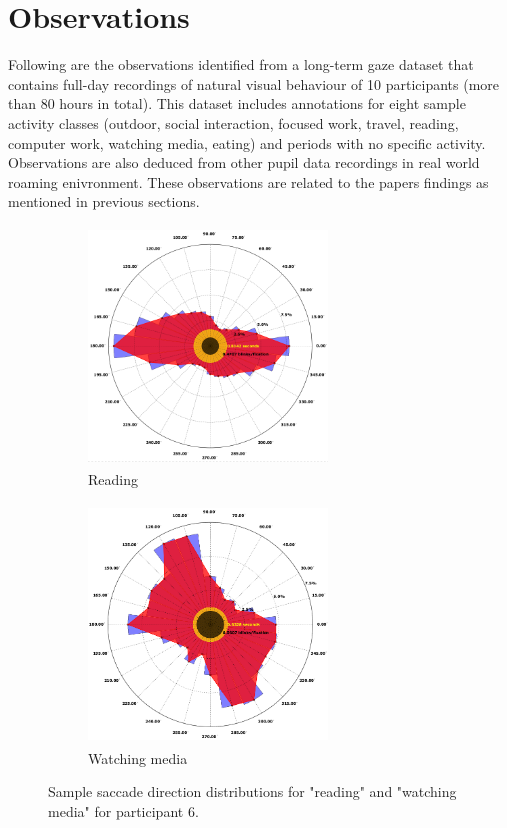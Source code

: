 \newpage

\section{Observations}

Following are the observations identified from a long-term gaze dataset \cite{28} that contains full-day recordings of natural visual behaviour of 10 participants (more than 80 hours in total). This dataset includes annotations for eight sample activity classes (outdoor, social interaction, focused work, travel, reading, computer work, watching media, eating) and periods with no specific activity. Observations are also deduced from other pupil data recordings in real world roaming enivronment. These observations are related to the papers findings as mentioned in previous sections.\\

\begin{figure}[!hbt]
  \begin{subfigure}{.5\textwidth}
    \centering
    \includegraphics[width=2.5in,height=2.5in]{obs1.png}
    \caption{Reading}
    \label{obs1}
  \end{subfigure}
  \begin{subfigure}{.5\textwidth}
    \centering
    \includegraphics[width=2.5in,height=2.5in]{obs2.png}
    \caption{Watching media}
    \label{obs2}
  \end{subfigure}
  \caption{Sample saccade direction distributions for "reading" and "watching media" for participant 6.}
\end{figure}



